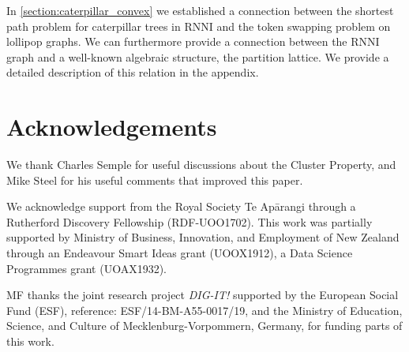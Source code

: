 \documentclass[11pt]{amsart}
\newcommand{\rnni}{\mathrm{RNNI}}
\newcommand{\summary}[1]{} %
\begin{document}
\summary{partition lattice -- can be found in appendix}
In \autoref{section:caterpillar_convex} we established a connection between the shortest path problem for caterpillar trees in $\rnni$ and the token swapping problem on lollipop graphs.
We can furthermore provide a connection between the $\rnni$ graph and a well-known algebraic structure, the partition lattice.
We provide a detailed description of this relation in the appendix.


\section*{Acknowledgements}
We thank Charles Semple for useful discussions about the Cluster Property, and Mike Steel for his useful comments that improved this paper.

We acknowledge support from the Royal Society Te Ap\=arangi through a Rutherford Discovery Fellowship (RDF-UOO1702).
This work was partially supported by Ministry of Business, Innovation, and Employment of New Zealand through an Endeavour Smart Ideas grant (UOOX1912), a Data Science Programmes grant (UOAX1932).

MF thanks the joint research project \textit{DIG-IT!} supported by the European Social Fund (ESF), reference: ESF/14-BM-A55-0017/19, and the Ministry of Education, Science, and Culture of Mecklenburg-Vorpommern, Germany, for funding parts of this work.

\printbibliography
\end{document}
